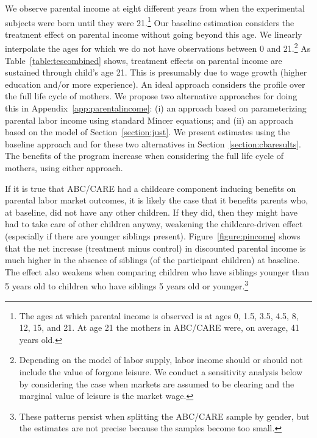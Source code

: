 We observe parental income at eight different years from when the experimental subjects were born until they were 21.\footnote{The ages at which parental income is observed is at ages 0, 1.5, 3.5, 4.5, 8, 12, 15, and 21. At age 21 the mothers in ABC/CARE were, on average, 41 years old.} Our baseline estimation considers the treatment effect on parental income without going beyond this age. We linearly interpolate the ages for which we do not have observations between 0 and 21.\footnote{Depending on the model of labor supply, labor income should or should not include the value of forgone leisure. We conduct a sensitivity analysis below by considering the case when markets are assumed to be clearing and the marginal value of leisure is the market wage.} As Table~\ref{table:tescombined} shows, treatment effects on parental income are sustained through child's age 21. This is presumably due to wage growth (higher education and/or more experience). An ideal approach considers the profile over the full life cycle of mothers. We propose two alternative approaches for doing this in Appendix~\ref{app:parentalincome}: (i) an approach based on parameterizing parental labor income using standard Mincer equations; and (ii) an approach based on the model of Section~\ref{section:just}. We present estimates using the baseline approach and for these two alternatives in Section~\ref{section:cbaresults}. The benefits of the program increase when considering the full life cycle of mothers, using either approach.

If it is true that ABC/CARE had a childcare component inducing benefits on parental labor market outcomes, it is likely the case that it benefits parents who, at baseline, did not have any other children. If they did, then they might have had to take care of other children anyway, weakening the childcare-driven effect (especially if there are younger siblings present). Figure~\ref{figure:pincome} shows that the net increase (treatment minus control) in discounted parental income is much higher in the absence of siblings (of the participant children) at baseline. The effect also weakens when comparing children who have siblings younger than 5 years old to children who have siblings 5 years old or younger.\footnote{These patterns persist when splitting the ABC/CARE sample by gender, but the estimates are not precise because the samples become too small.}

